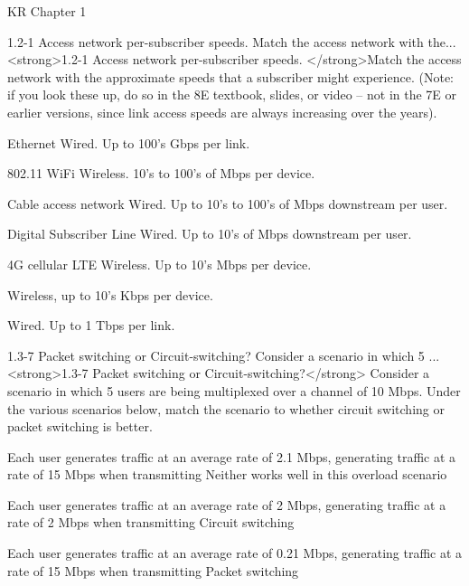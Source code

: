 \documentclass[a4paper]{article}
\begin{document}
\begin{quiz}{KR Chapter 1}
\begin{matching}[
	points=1,
	penalty=0.33333,
]{1.2-1 Access network per-subscriber speeds. Match the access network with the...}
<strong>1.2-1 Access network per-subscriber speeds. </strong>Match the access network with the approximate speeds that a subscriber might experience. (Note: if you look these up, do so in the 8E textbook, slides, or video -- not in the 7E or earlier versions, since link access speeds are always increasing over the years).
%
\item Ethernet \answer Wired. Up to 100's Gbps per link.
\item 802.11 WiFi \answer Wireless. 10’s to 100’s of Mbps per device.
\item Cable access network \answer Wired. Up to 10’s to 100’s of Mbps downstream per user.
\item Digital Subscriber Line \answer Wired. Up to 10’s of Mbps downstream per user.
\item 4G cellular LTE \answer Wireless. Up to 10’s Mbps per device.
\item \answer Wireless, up to 10's Kbps per device.
\item \answer Wired. Up to 1 Tbps per link.
\end{matching}

\begin{matching}[
	points=1,
	penalty=0.33333,
]{1.3-7 Packet switching or Circuit-switching? Consider a scenario in which 5 ...}
<strong>1.3-7 Packet switching or Circuit-switching?</strong> Consider a scenario in which 5 users are being multiplexed over a channel of 10 Mbps.  Under the various scenarios below, match the scenario to whether circuit switching or packet switching is better.
\item Each user generates traffic at an average rate of 2.1 Mbps, generating traffic at a rate of 15 Mbps when transmitting \answer Neither works well in this overload scenario
\item Each user generates traffic at an average rate of 2 Mbps, generating traffic at a rate of 2 Mbps when transmitting \answer Circuit switching
\item Each user generates traffic at an average rate of 0.21 Mbps, generating traffic at a rate of 15 Mbps when transmitting \answer Packet switching
\end{matching}


\end{quiz}
\end{document}
